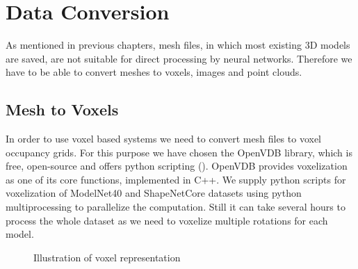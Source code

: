 \section{Data Conversion}
As mentioned in previous chapters,  mesh files, in which most existing 3D models are saved, are not suitable for direct processing by neural networks. Therefore we have to be able to convert meshes to voxels, images and point clouds.

\subsection{Mesh to Voxels}
In order to use voxel based systems we need to convert mesh files to voxel occupancy grids. For this purpose we have chosen the OpenVDB library, which is free, open-source and offers python scripting (\cite{museth_openvdb:_2013}). OpenVDB provides voxelization as one of its core functions, implemented in C++. We supply python scripts for voxelization of ModelNet40 and ShapeNetCore datasets using python multiprocessing to parallelize the computation. Still it can take several hours to process the whole dataset as we need to voxelize multiple rotations for each model. 

\begin{figure}[!h]
	\centering
	\qquad
	\caption{Illustration of voxel representation}
\end{figure}

